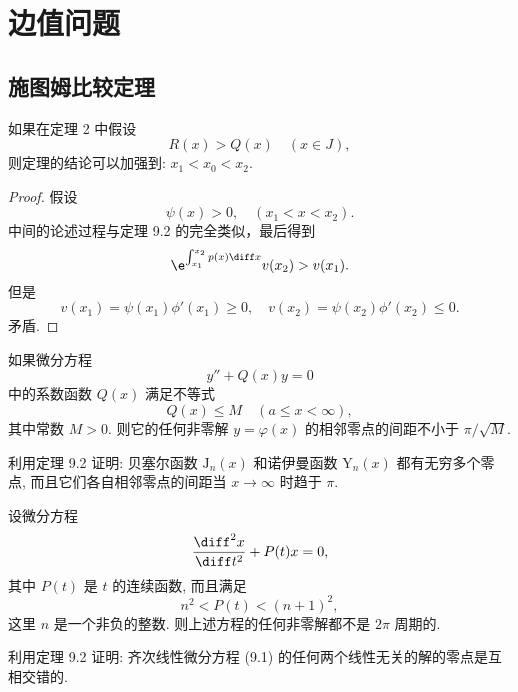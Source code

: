 \chapter{边值问题}

\section{施图姆比较定理}

\begin{exercise}
  如果在定理 2 中假设
  \[R(x) > Q(x)\quad (x\in J),\]
  则定理的结论可以加强到: $x_1 < x_0 < x_2$.
\end{exercise}

\begin{proof}
  假设
  \[\psi(x) > 0, \quad (x_1 < x < x_2).\]
  中间的论述过程与定理 9.2 的完全类似，最后得到
  \[\e^{\int_{x_1}^{x_2} p(x) \diff x} v(x_2) > v(x_1).\]
  但是
  \[v(x_1) = \psi(x_1)\phi'(x_1) \geq 0,
    \quad v(x_2) = \psi(x_2)\phi'(x_2)\leq 0.\]
  矛盾.
\end{proof}


\begin{exercise}
  如果微分方程
  \[y'' + Q(x)y = 0\]
  中的系数函数 $Q(x)$ 满足不等式
  \[Q(x) \leq M\quad (a\leq x<\infty),\]
  其中常数 $M>0$. 则它的任何非零解 $y = \varphi(x)$ 的相邻零点的间距不小于 $\pi/\sqrt{M}$.
\end{exercise}


\begin{exercise}
  利用定理 9.2 证明: 贝塞尔函数 $\mathrm{J}_n(x)$ 和诺伊曼函数 $\mathrm{Y}_n(x)$
  都有无穷多个零点, 而且它们各自相邻零点的间距当 $x\to\infty$ 时趋于 $\pi$.
\end{exercise}


\begin{exercise}
  设微分方程
  \[\frac{\diff^2 x}{\diff t^2} + P(t)x = 0,\]
  其中 $P(t)$ 是 $t$ 的连续函数, 而且满足
  \[n^2 < P(t) < (n+1)^2,\]
  这里 $n$ 是一个非负的整数.
  则上述方程的任何非零解都不是 $2\pi$ 周期的.
\end{exercise}


\begin{exercise}
  利用定理 9.2 证明: 齐次线性微分方程 (9.1) 的任何两个线性无关的解的零点是互相交错的.
\end{exercise}
